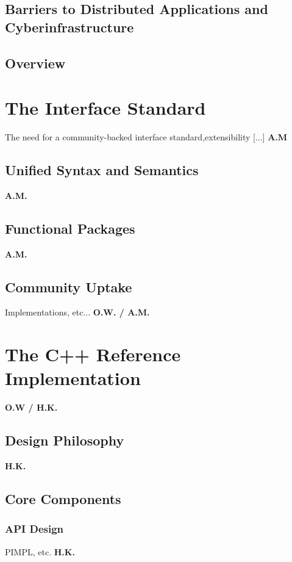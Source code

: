 \documentclass[a4paper,10pt]{article}
\begin{document}
\subsection{Barriers to Distributed Applications and Cyberinfrastructure}

 
\subsection{Overview}
 
 \section{The Interface Standard}

 The need for a community-backed interface standard,extensibility
 [...] \textbf{A.M}

 \subsection{Unified Syntax and Semantics}
 \textbf{A.M.}
 
 \subsection{Functional Packages}
 \textbf{A.M.}

 \subsection{Community Uptake}
 Implementations, etc... \textbf{O.W. / A.M.}

 \section{The C++ Reference Implementation}
 \textbf{O.W / H.K.}
 
 \subsection{Design Philosophy}
 \textbf{H.K.}

 \subsection{Core Components}
 
 \subsubsection{API Design}
 PIMPL, etc. \textbf{H.K.}
 
\end{document}
